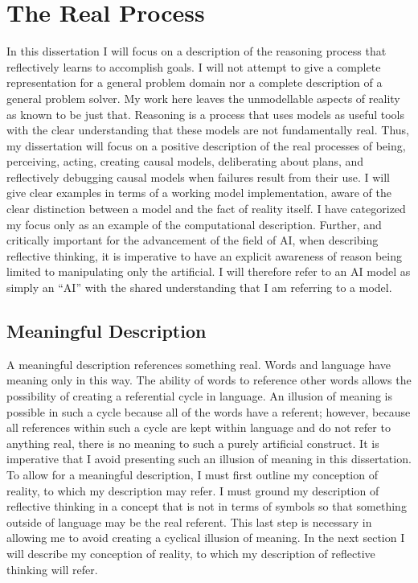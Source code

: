 \chapter{The Real Process}
\label{ch:the_real_process}

In this dissertation I will focus on a description of the reasoning
process that reflectively learns to accomplish goals.  I will not
attempt to give a complete representation for a general problem domain
nor a complete description of a general problem solver.  My work here
leaves the unmodellable aspects of reality as known to be just that.
Reasoning is a process that uses models as useful tools with the clear
understanding that these models are not fundamentally real.  Thus, my
dissertation will focus on a positive description of the real
processes of being, perceiving, acting, creating causal models,
deliberating about plans, and reflectively debugging causal models
when failures result from their use.  I will give clear examples in
terms of a working model implementation, aware of the clear
distinction between a model and the fact of reality itself.  I have
categorized my focus only as an example of the computational
description.  Further, and critically important for the advancement of
the field of AI, when describing reflective thinking, it is imperative
to have an explicit awareness of reason being limited to manipulating
only the artificial.  I will therefore refer to an AI model as simply
an ``AI'' with the shared understanding that I am referring to a
model.

\section{Meaningful Description}

A meaningful description references something real.  Words and
language have meaning only in this way.  The ability of words to
reference other words allows the possibility of creating a referential
cycle in language.  An illusion of meaning is possible in such a cycle
because all of the words have a referent; however, because all
references within such a cycle are kept within language and do not
refer to anything real, there is no meaning to such a purely
artificial construct.  It is imperative that I avoid presenting such
an illusion of meaning in this dissertation.  To allow for a
meaningful description, I must first outline my conception of reality,
to which my description may refer.  I must ground my description of
reflective thinking in a concept that is not in terms of symbols so
that something outside of language may be the real referent.  This
last step is necessary in allowing me to avoid creating a cyclical
illusion of meaning.  In the next section I will describe my
conception of reality, to which my description of reflective thinking
will refer.

